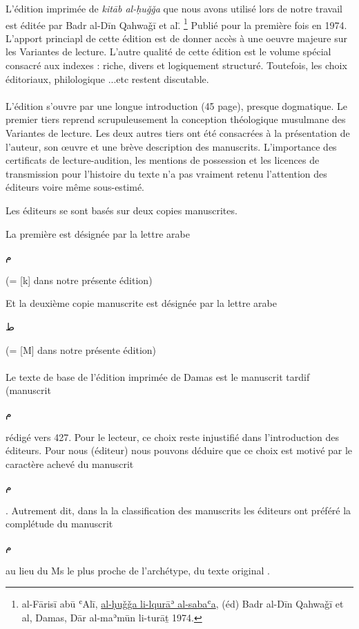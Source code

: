 \documentclass[a4paper,12pt]{report}
\begin{document}
\begin{itemize}
\begin{enumerate}
L'édition imprimée de \textit{kitāb al-ḥuǧǧa } que nous avons utilisé lors de notre travail est éditée par Badr al-Dīn Qahwaǧī et al.̄ \footnote{ al-Fārisī abū ʿAlī, \underline{ al-ḥuǧǧa li-lqurāʾ al-sabaʿa}, (éd) Badr al-Dīn Qahwaǧī et al, Damas,  Dār al-maʾmūn li-turāṯ  1974.} Publié pour la première fois en 1974. L'apport princiapl de cette édition est de donner accès à une oeuvre majeure sur les Variantes de lecture. L'autre qualité de cette édition est le volume spécial consacré aux indexes : riche, divers et logiquement structuré.   Toutefois, les choix éditoriaux, philologique ...etc restent discutable.   
\paragraph{}
L'édition s'ouvre  par une longue introduction (45 page), presque dogmatique. Le premier tiers  reprend scrupuleusement  la conception théologique musulmane des Variantes de lecture.  Les deux autres tiers ont été consacrées à  la présentation de l'auteur, son œuvre  et une brève  description des manuscrits. L'importance des certificats de lecture-audition, les mentions de possession et les licences de transmission pour l'histoire du texte n'a pas vraiment retenu l'attention des éditeurs voire même sous-estimé.   

Les éditeurs se sont basés sur deux copies manuscrites.

 La première est désignée par la lettre arabe \begin{Arabic}
  \Large  {م}
\end{Arabic}  (=  [k] dans notre présente édition)

 Et la deuxième copie manuscrite est désignée  par la lettre arabe \begin{Arabic}
   \Large {ط}
\end{Arabic}(= [M] dans notre présente édition)
\paragraph{}
Le texte de base de l'édition imprimée de Damas  est le manuscrit tardif (manuscrit  \begin{Arabic}
  \Large  {م}
\end{Arabic} rédigé vers 427. Pour le lecteur,  ce choix reste injustifié  dans l'introduction des éditeurs. Pour nous (éditeur)  nous pouvons déduire  que ce choix est  motivé par le caractère  achevé du  manuscrit  \begin{Arabic}   
  \Large  {م}
\end{Arabic}. Autrement dit, dans la la classification des manuscrits les éditeurs ont préféré la complétude du manuscrit \begin{Arabic}
  \Large  {م}
\end{Arabic} au lieu du Ms le plus proche de l'archétype, du texte original .     


\end{enumerate}
\end{itemize}
\end{document}
